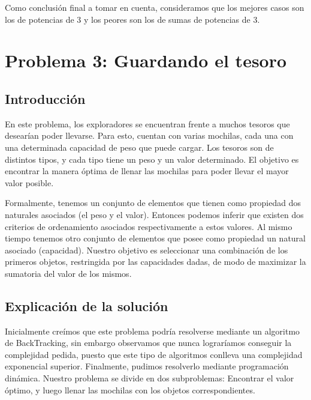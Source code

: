 \documentclass[spanish,12pt]{article}
\begin{document}
{Como conclusión final a tomar en cuenta, consideramos que los mejores casos son los de potencias de 3 y los peores son los de sumas de potencias de 3.






\section{Problema 3: Guardando el tesoro}

\subsection{Introducción}

En este problema, los exploradores se encuentran frente a muchos tesoros que desearían poder llevarse. Para esto, cuentan con varias mochilas, cada una con una determinada capacidad de peso que puede cargar.
Los tesoros son de distintos tipos, y cada tipo tiene un peso y un valor determinado.
El objetivo es encontrar la manera óptima de llenar las mochilas para poder llevar el mayor valor posible.

Formalmente, tenemos un conjunto de elementos que tienen como propiedad dos naturales asociados (el peso y el valor). Entonces podemos inferir que existen dos criterios de ordenamiento asociados respectivamente a estos valores.
Al mismo tiempo tenemos otro conjunto de elementos que posee como propiedad un natural asociado (capacidad).
Nuestro objetivo es seleccionar una combinación de los primeros objetos, restringida por las capacidades dadas, de modo de maximizar la sumatoria del valor de los mismos. 


\subsection{Explicación de la solución}

   Inicialmente creímos que este problema podría resolverse mediante un algoritmo de BackTracking, sin embargo observamos que nunca lograríamos conseguir la complejidad pedida, puesto que este tipo de algoritmos conlleva una complejidad exponencial superior.
   Finalmente, pudimos resolverlo mediante programación dinámica. Nuestro problema se divide en dos subproblemas:
   Encontrar el valor óptimo, y luego llenar las mochilas con los objetos correspondientes.

}
\end{document}
